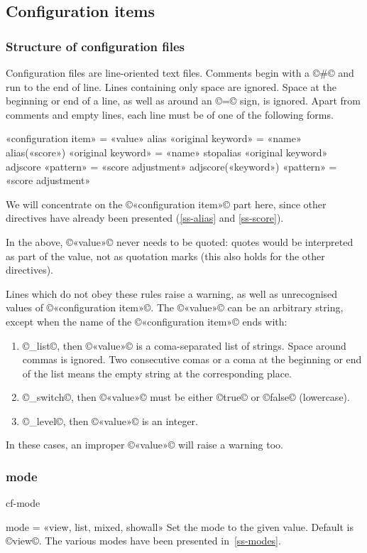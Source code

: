 \documentclass[a4paper, oneside]{scrartcl}
\makeatletter
\newif\ifframed
\newenvironment{cmdsubsub}[2]{%
  \framedfalse \commandes\subsubsection{#1}{#2}%
  }{%
  \endcommandes}
\newenvironment{htcode}{%
  \SaveVerbatim[samepage, gobble=2]{verbmat}%
  }{%
  \endSaveVerbatim
  \par\medskip\noindent\hspace*{\parindent}%
  \BUseVerbatim{verbmat}%
  \par\medskip\@endpetrue}
\makeatother
\begin{document}
\subsection{Configuration items}\label{ss-conf}

\subsubsection{Structure of configuration files}\label{sss-sonf-struct}

Configuration files are line-oriented text files. Comments begin with a ©#©
and run to the end of line. Lines containing only space are ignored. Space at
the beginning or end of a line, as well as around an ©=© sign, is ignored.
Apart from comments and empty lines, each line must be of one of the following
forms.

\begin{htcode}
  «configuration item» = «value»
  alias «original keyword» = «name»
  alias(«score») «original keyword» = «name»
  stopalias «original keyword»
  adjscore «pattern» = «score adjustment»
  adjscore(«keyword») «pattern» = «score adjustment»
\end{htcode}

We will concentrate on the ©«configuration item»© part here, since other
directives have already been presented (\ref{ss-alias} and \ref{ss-score}).

In the above, ©«value»©  never needs to be quoted: quotes would be interpreted
as part of the value, not as quotation marks (this also holds for the other
directives).

Lines which do not obey these rules raise a warning, as well as unrecognised
values of ©«configuration item»©. The ©«value»© can be an arbitrary string,
except when the name of the ©«configuration item»© ends with:
\begin{enumerate}
  \item ©_list©, then ©«value»© is a coma-separated list of strings. Space
    around commas is ignored. Two consecutive comas or a coma at the beginning
    or end of the list means the empty string at the corresponding place.
  \item ©_switch©, then ©«value»© must be either ©true© or ©false©
    (lowercase).
  \item ©_level©, then ©«value»© is an integer.
\end{enumerate}
In these cases, an improper ©«value»© will raise a warning too.

\begin{cmdsubsub}{mode}{cf-mode}
  mode = «view, list, mixed, showall»
\end{cmdsubsub}
Set the  mode to the given value.  Default is ©view©. The various modes
have been presented in~\ref{ss-modes}.
\end{document}
